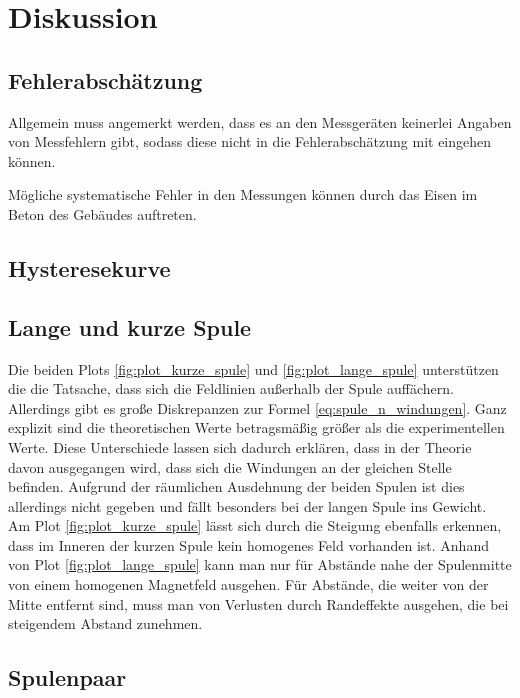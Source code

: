 \section{Diskussion}


\subsection{Fehlerabschätzung}
Allgemein muss angemerkt werden, dass es an den Messgeräten keinerlei Angaben von Messfehlern gibt,
sodass diese nicht in die Fehlerabschätzung mit eingehen können.

\noindent
Mögliche systematische Fehler in den Messungen können durch das Eisen im Beton des Gebäudes auftreten.


\subsection{Hysteresekurve}

\subsection{Lange und kurze Spule}
Die beiden Plots \ref{fig:plot_kurze_spule} und \ref{fig:plot_lange_spule} unterstützen die die Tatsache, 
dass sich die Feldlinien außerhalb der Spule auffächern.
Allerdings gibt es große Diskrepanzen zur Formel \eqref{eq:spule_n_windungen}.
Ganz explizit sind die theoretischen Werte betragsmäßig größer als die experimentellen Werte.
Diese Unterschiede lassen sich dadurch erklären, dass in der Theorie davon ausgegangen wird, dass sich die Windungen an der gleichen Stelle befinden.
Aufgrund der räumlichen Ausdehnung der beiden Spulen ist dies allerdings nicht gegeben und fällt besonders bei der langen Spule ins Gewicht.
Am Plot \ref{fig:plot_kurze_spule} lässt sich durch die Steigung ebenfalls erkennen, dass im Inneren der kurzen Spule kein homogenes Feld vorhanden ist.
Anhand von Plot \ref{fig:plot_lange_spule} kann man nur für Abstände nahe der Spulenmitte von einem homogenen Magnetfeld ausgehen.
Für Abstände, die weiter von der Mitte entfernt sind, muss man von Verlusten durch Randeffekte ausgehen, die bei steigendem Abstand zunehmen.


\subsection{Spulenpaar}


